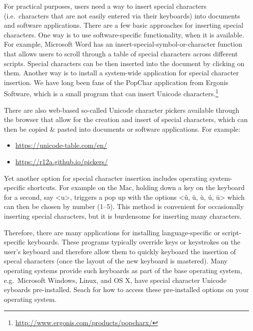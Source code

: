For practical purposes, users need a way to insert special characters (i.e.\ characters that are not easily entered via their keyboards) into documents and software applications. There are a few basic approaches for inserting special characters. One way is to use software-specific functionality, when it is available. For example, Microsoft Word has an insert-special-symbol-or-character function that allows users to scroll through a table of special characters across different scripts. Special characters can be then inserted into the document by clicking on them. Another way is to install a system-wide application for special character insertion. We have long been fans of the PopChar application from Ergonis Software, which is a small program that can insert Unicode characters.\footnote{\url{http://www.ergonis.com/products/popcharx/}}

There are also web-based so-called Unicode character pickers available through the browser that allow for the creation and insert of special characters, which can then be copied \& pasted into documents or software applications. For example:

\begin{itemize}
	\item \url{https://unicode-table.com/en/}
	\item \url{https://r12a.github.io/pickers/}
\end{itemize}

Yet another option for special character insertion includes operating system-specific shortcuts. For example on the Mac, holding down a key on the keyboard for a second, say <u>, triggers a pop up with the options <û, ü, ù, ú, ū> which can then be chosen by number (1--5). This method is convenient for occasionally inserting special characters, but it is burdensome for inserting many characters. 

Therefore, there are many applications for installing language-specific or script-specific keyboards. These programs typically override keys or keystrokes on the user's keyboard and therefore allow them to quickly keyboard the insertion of specal characters (once the layout of the new keyboard is mastered). Many operating systems provide such keyboards as part of the base operating system, e.g.\ Microsoft Windows, Linux, and OS X, have special character Unicode eyboards pre-installed. Seach for how to access these pre-installed options on your operating system.

